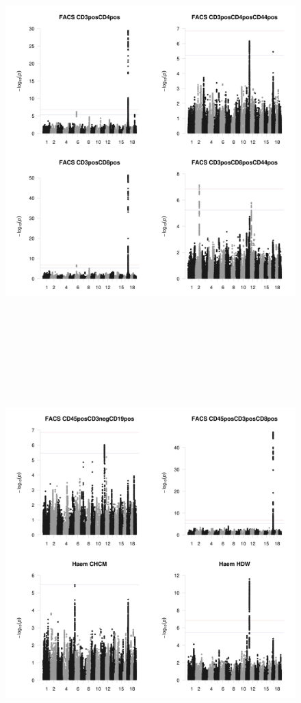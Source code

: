 \documentclass{article}
\begin{document}
\begin{figure}
\begin{center}
\includegraphics[width=15cm, height=15cm]{21.jpeg}
\end{center}
\end{figure}


\begin{figure}
\begin{center}
\includegraphics[width=15cm, height=15cm]{25.jpeg}
\end{center}
\end{figure}
\end{document}
